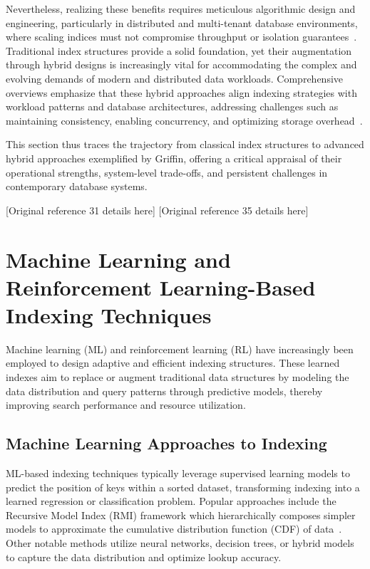 \documentclass[sigconf]{acmart}
\begin{document}
Nevertheless, realizing these benefits requires meticulous algorithmic design and engineering, particularly in distributed and multi-tenant database environments, where scaling indices must not compromise throughput or isolation guarantees~\cite{ref31,ref35}. Traditional index structures provide a solid foundation, yet their augmentation through hybrid designs is increasingly vital for accommodating the complex and evolving demands of modern and distributed data workloads. Comprehensive overviews emphasize that these hybrid approaches align indexing strategies with workload patterns and database architectures, addressing challenges such as maintaining consistency, enabling concurrency, and optimizing storage overhead~\cite{ref31}.

This section thus traces the trajectory from classical index structures to advanced hybrid approaches exemplified by Griffin, offering a critical appraisal of their operational strengths, system-level trade-offs, and persistent challenges in contemporary database systems.

\begin{thebibliography}{99}
 [Original reference 31 details here]
 [Original reference 35 details here]
\end{thebibliography}

\section{Machine Learning and Reinforcement Learning-Based Indexing Techniques}

Machine learning (ML) and reinforcement learning (RL) have increasingly been employed to design adaptive and efficient indexing structures. These learned indexes aim to replace or augment traditional data structures by modeling the data distribution and query patterns through predictive models, thereby improving search performance and resource utilization.

\subsection{Machine Learning Approaches to Indexing}

ML-based indexing techniques typically leverage supervised learning models to predict the position of keys within a sorted dataset, transforming indexing into a learned regression or classification problem. Popular approaches include the Recursive Model Index (RMI) framework which hierarchically composes simpler models to approximate the cumulative distribution function (CDF) of data~\cite{}. Other notable methods utilize neural networks, decision trees, or hybrid models to capture the data distribution and optimize lookup accuracy.
\end{document}
